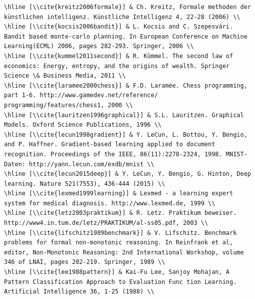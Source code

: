 \documentclass[10pt]{book}
\begin{document}
\begin{verbatim}
\hline [\\cite{kreitz2006formale}] & Ch. Kreitz, Formale methoden der künstlichen intelligenz. Künstliche Intelligenz 4, 22-28 (2006) \\
\hline [\\cite{kocsis2006bandit}] & L. Kocsis and C. Szepesvári. Bandit based monte-carlo planning. In European Conference on Machine Learning(ECML) 2006, pages 282-293. Springer, 2006 \\
\hline [\\cite{kummel2011second}] & R. Kümmel. The second law of economics: Energy, entropy, and the origins of wealth. Springer Science \& Business Media, 2011 \\
\hline [\\cite{laramee2000chess}] & F.D. Laramée. Chess programming, part 1-6. http://www.gamedev.net/reference/ programming/features/chess1, 2000 \\
\hline [\\cite{lauritzen1996graphical}] & S.L. Lauritzen. Graphical Models. Oxford Science Publications, 1996 \\
\hline [\\cite{lecun1998gradient}] & Y. LeCun, L. Bottou, Y. Bengio, and P. Haffner. Gradient-based learning applied to document recognition. Proceedings of the IEEE, 86(11):2278-2324, 1998. MNIST-Daten: http://yann.lecun.com/exdb/mnist \\
\hline [\\cite{lecun2015deep}] & Y. LeCun, Y. Bengio, G. Hinton, Deep learning. Nature 521(7553), 436-444 (2015) \\
\hline [\\cite{lexmed1999learning}] & Lexmed - a learning expert system for medical diagnosis. http://www.lexmed.de, 1999 \\
\hline [\\cite{letz2003praktikum}] & R. Letz. Praktikum beweiser. http://www4.in.tum.de/letz/PRAKTIKUM/al-ss05.pdf, 2003 \\
\hline [\\cite{lifschitz1989benchmark}] & V. Lifschitz. Benchmark problems for formal non-monotonic reasoning. In Reinfrank et al, editor, Non-Monotonic Reasoning: 2nd International Workshop, volume 346 of LNAI, pages 202-219. Springer, 1989 \\
\hline [\\cite{lee1988pattern}] & Kai-Fu Lee, Sanjoy Mohajan, A Pattern Classification Approach to Evaluation Func tion Learning. Artificial Intelligence 36, 1-25 (1988) \\

\end{verbatim}
\end{document}
